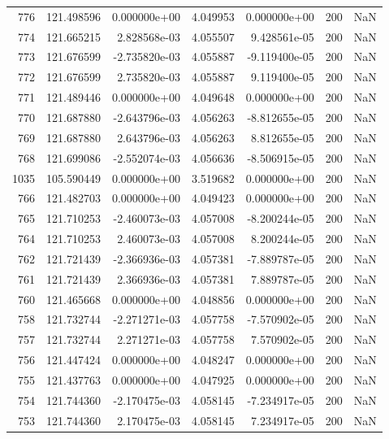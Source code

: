 \begin{tabular}{rrrrrrr}
 776 & 121.498596 &  0.000000e+00 &  4.049953 &  0.000000e+00 &         200 & NaN \\
 774 & 121.665215 &  2.828568e-03 &  4.055507 &  9.428561e-05 &         200 & NaN \\
 773 & 121.676599 & -2.735820e-03 &  4.055887 & -9.119400e-05 &         200 & NaN \\
 772 & 121.676599 &  2.735820e-03 &  4.055887 &  9.119400e-05 &         200 & NaN \\
 771 & 121.489446 &  0.000000e+00 &  4.049648 &  0.000000e+00 &         200 & NaN \\
 770 & 121.687880 & -2.643796e-03 &  4.056263 & -8.812655e-05 &         200 & NaN \\
 769 & 121.687880 &  2.643796e-03 &  4.056263 &  8.812655e-05 &         200 & NaN \\
 768 & 121.699086 & -2.552074e-03 &  4.056636 & -8.506915e-05 &         200 & NaN \\
1035 & 105.590449 &  0.000000e+00 &  3.519682 &  0.000000e+00 &         200 & NaN \\
 766 & 121.482703 &  0.000000e+00 &  4.049423 &  0.000000e+00 &         200 & NaN \\
 765 & 121.710253 & -2.460073e-03 &  4.057008 & -8.200244e-05 &         200 & NaN \\
 764 & 121.710253 &  2.460073e-03 &  4.057008 &  8.200244e-05 &         200 & NaN \\
 762 & 121.721439 & -2.366936e-03 &  4.057381 & -7.889787e-05 &         200 & NaN \\
 761 & 121.721439 &  2.366936e-03 &  4.057381 &  7.889787e-05 &         200 & NaN \\
 760 & 121.465668 &  0.000000e+00 &  4.048856 &  0.000000e+00 &         200 & NaN \\
 758 & 121.732744 & -2.271271e-03 &  4.057758 & -7.570902e-05 &         200 & NaN \\
 757 & 121.732744 &  2.271271e-03 &  4.057758 &  7.570902e-05 &         200 & NaN \\
 756 & 121.447424 &  0.000000e+00 &  4.048247 &  0.000000e+00 &         200 & NaN \\
 755 & 121.437763 &  0.000000e+00 &  4.047925 &  0.000000e+00 &         200 & NaN \\
 754 & 121.744360 & -2.170475e-03 &  4.058145 & -7.234917e-05 &         200 & NaN \\
 753 & 121.744360 &  2.170475e-03 &  4.058145 &  7.234917e-05 &         200 & NaN \\

\end{tabular}
